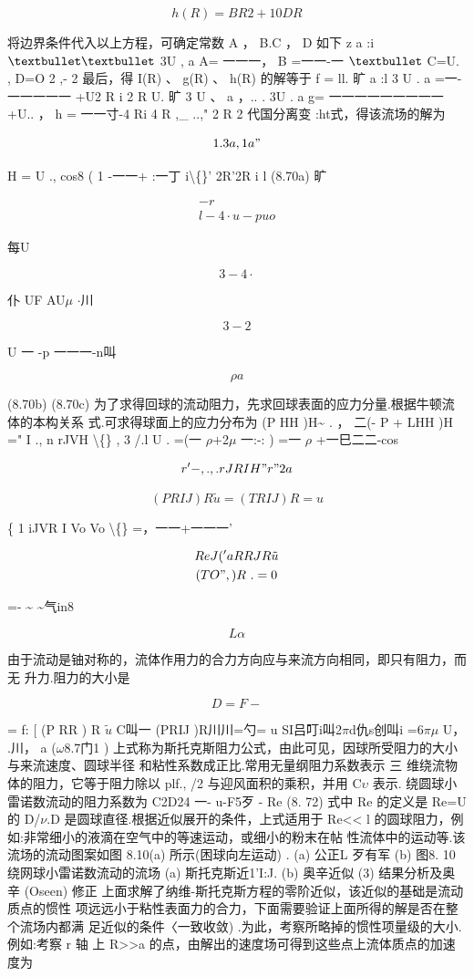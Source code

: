 \[h(R) = BR 2 + 10DR\]

将边界条件代入以上方程，可确定常数 A ， B.C ， D 如下 z a :i ${\rm ••}$ 3U , a A= 一一一， B =一一-一 ${\rm •}$ C=U. , D=O 2 ,- 2 最后，得 I(R) 、 g(R) 、 h(R) 的解等于 f = ll. 旷 a :l 3 U . a =一-一一一一一 +U2 R i 2 R U. 旷 3 U 、 a ，.. . 3U . a g= 一一一一一一一一一 +U.. ， h = 一一寸-4 Ri 4 R ,\_ ..," 2 R 2 代国分离变 :ht式，得该流场的解为

\[1. 3 a , 1 a"  \]

H = U ., cos8 ( 1 -一一+ :一丁 i\textbackslash\{\}' 2R'2R i l (8.70a) 旷

\begin{gather*}
-r\\
l-4\cdot  u-puo
\end{gather*}

每U

\[3-4\cdot \]

仆 UF AU$\mu$ $\cdot $川

\[3-2\]

U 一 -p 一一一-n叫

\[\rho a\]

(8.70b) (8.70c) 为了求得回球的流动阻力，先求回球表面的应力分量.根据牛顿流体的本构关系 式.可求得球面上的应力分布为 (P HH )H\textasciitilde{} . ， 二(- P + LHH )H =" I ., n rJVH \textbackslash\{\} , 3 /.l U . =(一 $\rho$+2$\mu$ 一:-: ) =一 $\rho$ +一巳二二-cos

\[  r' -,.,. rJ R I H " r" 2 a\]

\[(PRIJ)R\tilde{u} =(TRIJ)R =u\]

\{ 1 iJVR I  Vo Vo \textbackslash\{\} =，一一+一一一'

\begin{gather*}
  R eJ( 'aR R J R \tilde{u}\\
(TO", )R~. = 0
\end{gather*}

=- \textasciitilde{} \textasciitilde{}气in8

\[L\alpha \]

由于流动是铀对称的，流体作用力的合力方向应与来流方向相同，即只有阻力，而无 升力.阻力的大小是

\[D= F-\]

= f: [ (P RR ) R $\tilde{u}$ C叫一 (PRIJ )R川川=勺= u SI吕叮i叫2$\pi$d仇s创叫i =6$\pi$$\mu$ U， .川， a ($\omega$8.7门1 ) 上式称为斯托克斯阻力公式，由此可见，因球所受阻力的大小与来流速度、圆球半径 和粘性系数成正比.常用无量纲阻力系数表示 三 维绕流物体的阻力，它等于阻力除以 plf., /2 与迎风面积的乘积，并用 C$\upsilon$ 表示. 绕圆球小雷诺数流动的阻力系数为 C2D24 一- u-F5歹 - Re (8. 72) 式中 Re 的定义是 Re=U 的 D/$\nu$.D 是圆球直径.根据近似展开的条件，上式适用于 Re<< l 的圆球阻力，例如:非常细小的液滴在空气中的等速运动，或细小的粉末在帖 性流体中的运动等.该流场的流动图案如图 8.10(a) 所示(困球向左运动) . (a) 公正L 歹有军 (b) 图8. 10 绕网球小雷诺数流动的流场 (a) 斯托克斯近1'I:J. (b) 奥辛近似 (3) 结果分析及奥辛 (Oseen) 修正 上面求解了纳维-斯托克斯方程的零阶近似，该近似的基础是流动质点的惯性 项远远小于粘性表面力的合力，下面需要验证上面所得的解是否在整个流场内都满 足近似的条件〈一致收敛) .为此，考察所略掉的惯性项量级的大小.例如:考察 r 轴 上 R>>a 的点，由解出的速度场可得到这些点上流体质点的加速度为


